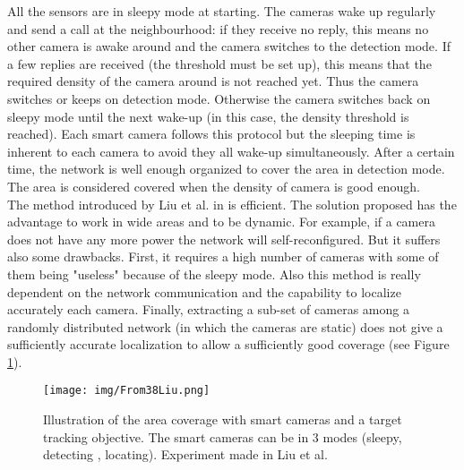 All the sensors are in sleepy mode at starting. The cameras wake up regularly and send a call at the neighbourhood: if they receive no reply, this means no other camera is awake around and the camera switches to the detection mode. If a few replies are received (the threshold must be set up), this means that the required density of the camera around is not reached yet. Thus the camera switches or keeps on detection mode. Otherwise the camera switches back on sleepy mode until the next wake-up (in this case, the density threshold is reached). Each smart camera follows this protocol but the sleeping time is inherent to each camera to avoid they all wake-up simultaneously. After a certain time, the network is well enough organized to cover the area in detection mode. The area is considered covered when the density of camera is good enough. \\
 The method introduced by Liu et al. in \cite{38*liu2010} is efficient. The solution proposed has the advantage to work in wide areas and to be dynamic. For example, if a camera does not have any more power the network will self-reconfigured. But it suffers also some drawbacks. First, it requires a high number of cameras with some of them being "useless" because of the sleepy mode. Also this method is really dependent on the network communication and the capability to localize accurately each camera. Finally, extracting a sub-set of cameras among a randomly distributed network (in which the cameras are static) does not give a sufficiently accurate localization to allow a sufficiently good coverage (see Figure \ref{fig:Coverage38}). 
	\begin{figure}[t!]
	\center
{}
   \texttt{[image: img/From38Liu.png]}
  \caption{Illustration of  the  area coverage with smart cameras and a target tracking objective. The smart cameras can be in 3 modes (sleepy, detecting , locating). Experiment made in Liu et al. \citep{38*liu2010}}\label{fig:Coverage38}
  \endminipage\hfill
\end{figure} 

